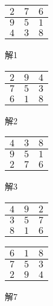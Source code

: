 \documentclass[11pt]{jsarticle}
\begin{document}
\begin{figure}[htbp]
  \captionsetup{labelformat=empty}
  \begin{minipage}{0.24\hsize}
    \centering
    \begin{tabular}{|c|c|c|}
      \hline
      $2$ & $7$ & $6$ \\ \hline
      $9$ & $5$ & $1$ \\ \hline
      $4$ & $3$ & $8$ \\ \hline
    \end{tabular}
    \caption{解1}
    \hypertarget{ans}{}
    \label{}
  \end{minipage}
  \begin{minipage}{0.24\hsize}
    \centering
    \begin{tabular}{|c|c|c|}
      \hline
      $2$ & $9$ & $4$ \\ \hline
      $7$ & $5$ & $3$ \\ \hline
      $6$ & $1$ & $8$ \\ \hline
    \end{tabular}
    \caption{解2}
    \label{}
  \end{minipage}
  \begin{minipage}{0.24\hsize}
    \centering
    \begin{tabular}{|c|c|c|}
      \hline
      $4$ & $3$ & $8$ \\ \hline
      $9$ & $5$ & $1$ \\ \hline
      $2$ & $7$ & $6$ \\ \hline
    \end{tabular}
    \caption{解3}
    \label{}
  \end{minipage}
  \begin{minipage}{0.24\hsize}
    \centering
    \begin{tabular}{|c|c|c|}
      \hline
      $4$ & $9$ & $2$ \\ \hline
      $3$ & $5$ & $7$ \\ \hline
      $8$ & $1$ & $6$ \\ \hline
    \end{tabular}
    \caption{解7}
    \label{}
  \end{minipage}
  \begin{minipage}{0.24\hsize}
    \centering
    \begin{tabular}{|c|c|c|}
      \hline
      $6$ & $1$ & $8$ \\ \hline
      $7$ & $5$ & $3$ \\ \hline
      $2$ & $9$ & $4$ \\ \hline

\end{tabular}
\end{minipage}
\end{figure}
\end{document}
